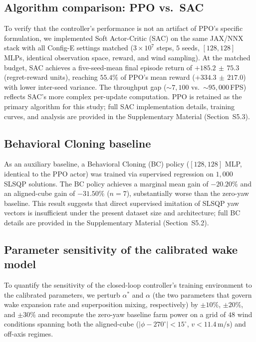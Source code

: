 \documentclass[final,5p,times]{elsarticle}
\begin{document}
\subsection{Algorithm comparison: PPO vs.\ SAC}\label{sec:ppo_vs_sac}
To verify that the controller's performance is not an artifact of PPO's specific formulation, we implemented Soft Actor-Critic (SAC) on the same JAX/NNX stack with all Config-E settings matched ($3{\times}10^{7}$ steps, $5$ seeds, $[128,128]$ MLPs, identical observation space, reward, and wind sampling). At the matched budget, SAC achieves a five-seed-mean final episode return of $+185.2\,\pm\,75.3$ (regret-reward units), reaching $55.4\%$ of PPO's mean reward ($+334.3\,\pm\,217.0$) with lower inter-seed variance. The throughput gap (${\sim}7{,}100$ vs.\ ${\sim}95{,}000$\,FPS) reflects SAC's more complex per-update computation. PPO is retained as the primary algorithm for this study; full SAC implementation details, training curves, and analysis are provided in the Supplementary Material (Section~S5.3).

\subsection{Behavioral Cloning baseline}\label{sec:bc_baseline}
As an auxiliary baseline, a Behavioral Cloning (BC) policy ($[128,128]$ MLP, identical to the PPO actor) was trained via supervised regression on $1{,}000$ SLSQP solutions. The BC policy achieves a marginal mean gain of $-20.20\%$ and an aligned-cube gain of $-31.50\%$ ($n{=}7$), substantially worse than the zero-yaw baseline. This result suggests that direct supervised imitation of SLSQP yaw vectors is insufficient under the present dataset size and architecture; full BC details are provided in the Supplementary Material (Section~S5.2).

\subsection{Parameter sensitivity of the calibrated wake model}\label{sec:param_sensitivity}
To quantify the sensitivity of the closed-loop controller's training environment to the calibrated parameters, we perturb $\alpha^*$ and $\alpha$ (the two parameters that govern wake expansion rate and superposition mixing, respectively) by $\pm10\%$, $\pm20\%$, and $\pm30\%$ and recompute the zero-yaw baseline farm power on a grid of $48$ wind conditions spanning both the aligned-cube ($|\phi{-}270^\circ|{<}15^\circ$, $v{<}11.4\,\mathrm{m/s}$) and off-axis regimes.
\end{document}
